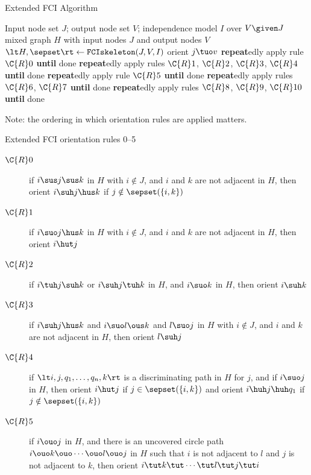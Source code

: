 \begin{frame}{Extended FCI Algorithm}
\begin{algorithmic}[1]
  \Input Input node set $J$; output node set $V$; independence model $I$ over $V \given J$
  \Output mixed graph $H$ with input nodes $J$ and output nodes $V$
  \State $\lt H,\sepset \rt \leftarrow \mathtt{FCIskeleton}(J,V,I)$
    \State orient $j \tuo v$
  \EndFor
  \State \textbf{repeat}edly apply rule $\C{R}0$ \textbf{until} done
  \State \textbf{repeat}edly apply rules $\C{R}1$, $\C{R}2$, $\C{R}3$, $\C{R}4$ \textbf{until} done
  \State \textbf{repeat}edly apply rule $\C{R}5$ \textbf{until} done
  \State \textbf{repeat}edly apply rules $\C{R}6$, $\C{R}7$ \textbf{until} done
  \State \textbf{repeat}edly apply rules $\C{R}8$, $\C{R}9$, $\C{R}10$ \textbf{until} done
\end{algorithmic}

\bigskip
Note: the ordering in which orientation rules are applied matters.
\end{frame}

\begin{frame}{Extended FCI orientation rules 0--5}
  \begin{description}
    \item[$\C{R}0$] if $i \sus j \sus k$ in $H$ with $i \notin J$, and $i$ and $k$ are not adjacent in $H$, then orient $i \suh j \hus k$ if $j \notin \sepset(\{i,k\})$ %
  \end{description}
  \begin{description}
    \item[$\C{R}1$] if $i \suo j \hus k$ in $H$ with $i \notin J$, and $i$ and $k$ are not adjacent in $H$, then orient $i \hut j$
    \item[$\C{R}2$] if $i \tuh j \suh k$ or $i \suh j \tuh k$ in $H$, and $i \suo k$ in $H$, then orient $i \suh k$
    \item[$\C{R}3$] if $i \suh j \hus k$ and $i \suo l \ous k$ and $l \suo j$ in $H$ with $i \notin J$, and $i$ and $k$ are not adjacent in $H$, then orient $l \suh j$
    \item[$\C{R}4$] if $\lt i, j, q_1, \dots, q_n, k \rt$ is a discriminating path in $H$ for $j$, and if $i \suo j$ in $H$, then orient $i \hut j$ if $j \in \sepset(\{i,k\})$ and orient $i \huh j \huh q_1$ if $j \notin \sepset(\{i,k\})$ %
  \end{description}
  \begin{description}
    \item[$\C{R}5$] if $i \ouo j$ in $H$, and there is an uncovered circle path $i \ouo k \ouo \cdots \ouo l \ouo j$ in $H$ such that $i$ is not adjacent to $l$ and $j$ is not adjacent to $k$, then orient $i \tut k \tut \cdots \tut l \tut j \tut i$
  \end{description}
\end{frame}

